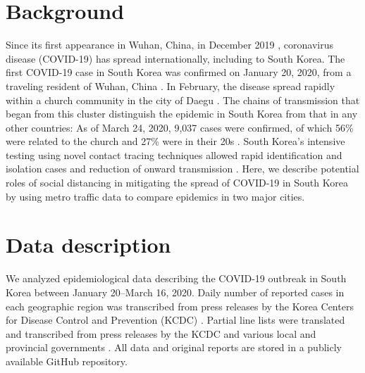 \documentclass[12pt]{article}
\date{\today}
\begin{document}


\pagebreak

\section{Background}

Since its first appearance in Wuhan, China, in December 2019 \citep{pneumonia}, coronavirus disease (COVID-19) has spread internationally, including to South Korea.
The first COVID-19 case in South Korea was confirmed on January 20, 2020, from a traveling resident of Wuhan, China \citep{kcdc}.
In February, the disease spread rapidly within a church community in the city of Daegu \citep{kcdc}.
The chains of transmission that began from this cluster distinguish the epidemic in South Korea from that in any other countries:
As of March 24, 2020, 9,037 cases were confirmed, of which 56\% were related to the church and 27\% were in their 20s \citep{kcdc}.
South Korea's intensive testing using novel contact tracing techniques allowed rapid identification and isolation cases and reduction of onward transmission \citep{fergusonimpact, tracingkorea, science}.
Here, we describe potential roles of social distancing in mitigating the spread of COVID-19 in South Korea by using metro traffic data to compare epidemics in two major cities.

\section{Data description}

We analyzed epidemiological data describing the COVID-19 outbreak in South Korea between January 20--March 16, 2020.
Daily number of reported cases in each geographic region was transcribed from press releases by the Korea Centers for Disease Control and Prevention (KCDC) \cite{kcdc}.
Partial line lists were translated and transcribed from press releases by the KCDC and various local and provincial governments \cite{seoul, busan, gwangju, ulsan, gyeonggi, daegu, gyeongnam}.
All data and original reports are stored in a publicly available GitHub repository.
\end{document}
